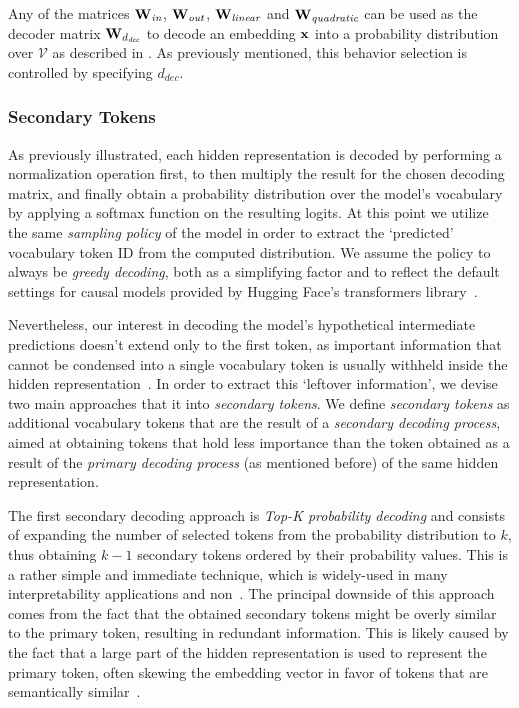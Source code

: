 Any of the matrices $\bm{\mathbf{W}}_\textit{in}$, $\bm{\mathbf{W}}_\textit{out}$, $\bm{\mathbf{W}}_\textit{linear}$ and $\bm{\mathbf{W}}_\textit{quadratic}$ can be used as the decoder matrix $\bm{\mathbf{W}}_{d_\textit{dec}}$ to decode an embedding $\bm{\mathbf{x}}$ into a probability distribution over $\mathcal{V}$ as described in .
As previously mentioned, this behavior selection is controlled by specifying $d_\textit{dec}$.

\subsubsection{Secondary Tokens}
    
As previously illustrated, each hidden representation is decoded by performing a normalization operation first, to then multiply the result for the chosen decoding matrix, and finally obtain a probability distribution over the model's vocabulary by applying a softmax function on the resulting logits.
At this point we utilize the same \emph{sampling policy} of the model in order to extract the `predicted' vocabulary token ID from the computed distribution.
We assume the policy to always be \emph{greedy decoding}, both as a simplifying factor and to reflect the default settings for causal models provided by Hugging Face's transformers library~\cite{wolf2020}.

Nevertheless, our interest in decoding the model's hypothetical intermediate predictions doesn't extend only to the first token, as important information that cannot be condensed into a single vocabulary token is usually withheld inside the hidden representation~\cite{elhage2022,henighan2023,elhage2023}.
In order to extract this `leftover information', we devise two main approaches that  it into \emph{secondary tokens}.
We define \emph{secondary tokens} as additional vocabulary tokens that are the result of a \emph{secondary decoding process}, aimed at obtaining tokens that hold less importance than the token obtained as a result of the \emph{primary decoding process} (as mentioned before) of the same hidden representation.

The first secondary decoding approach is \emph{Top-K probability decoding} and consists of expanding the number of selected tokens from the probability distribution to $k$, thus obtaining $k-1$ secondary tokens ordered by their probability values.
This is a rather simple and immediate technique, which is widely-used in many interpretability applications and non~\cite{belrose2023a,pal2023,tufanov2024}.
The principal downside of this approach comes from the fact that the obtained secondary tokens might be overly similar to the primary token, resulting in redundant information.
This is likely caused by the fact that a large part of the hidden representation is used to represent the primary token, often skewing the embedding vector in favor of tokens that are semantically similar~\cite{elhage2022}.

